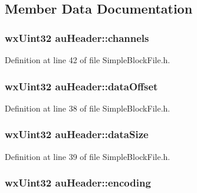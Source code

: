 \subsection{Member Data Documentation}
\subsubsection[{\texorpdfstring{channels}{channels}}]{\setlength{\rightskip}{0pt plus 5cm}wx\+Uint32 au\+Header\+::channels}\hypertarget{structau_header_abbf62d3e4696972c44867867aa180283}{}\label{structau_header_abbf62d3e4696972c44867867aa180283}


Definition at line 42 of file Simple\+Block\+File.\+h.

\subsubsection[{\texorpdfstring{data\+Offset}{dataOffset}}]{\setlength{\rightskip}{0pt plus 5cm}wx\+Uint32 au\+Header\+::data\+Offset}\hypertarget{structau_header_abe11be3f22c3abd4371a9b0e092120b6}{}\label{structau_header_abe11be3f22c3abd4371a9b0e092120b6}


Definition at line 38 of file Simple\+Block\+File.\+h.

\subsubsection[{\texorpdfstring{data\+Size}{dataSize}}]{\setlength{\rightskip}{0pt plus 5cm}wx\+Uint32 au\+Header\+::data\+Size}\hypertarget{structau_header_a25d33bd6cd02c40e9bd85a48510a9a6c}{}\label{structau_header_a25d33bd6cd02c40e9bd85a48510a9a6c}


Definition at line 39 of file Simple\+Block\+File.\+h.

\subsubsection[{\texorpdfstring{encoding}{encoding}}]{\setlength{\rightskip}{0pt plus 5cm}wx\+Uint32 au\+Header\+::encoding}\hypertarget{structau_header_ad277236bba519b9f329d7bbba373c30e}{}\label{structau_header_ad277236bba519b9f329d7bbba373c30e}


